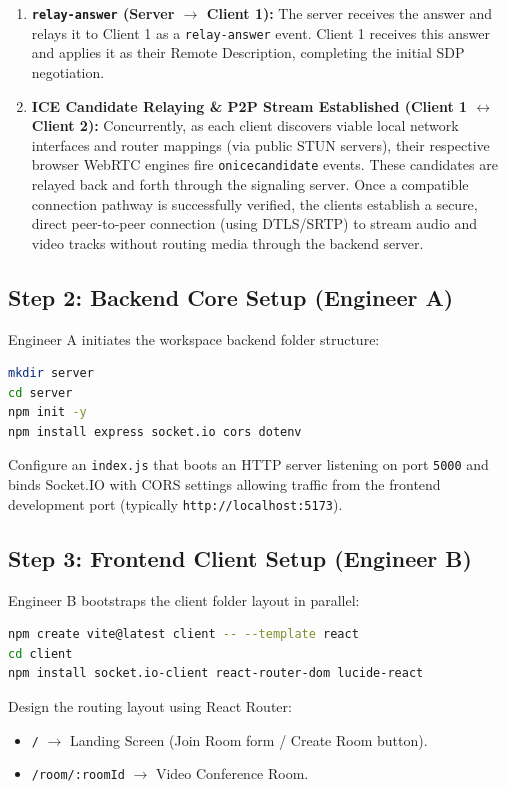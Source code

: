 \documentclass[11pt,a4paper]{article}
\begin{document}
\begin{enumerate}
    \item \textbf{\texttt{relay-answer} (Server $\rightarrow$ Client 1):} 
    The server receives the answer and relays it to Client 1 as a \texttt{relay-answer} event. Client 1 receives this answer and applies it as their Remote Description, completing the initial SDP negotiation.
    
    \item \textbf{ICE Candidate Relaying \& P2P Stream Established (Client 1 $\leftrightarrow$ Client 2):} 
    Concurrently, as each client discovers viable local network interfaces and router mappings (via public STUN servers), their respective browser WebRTC engines fire \texttt{onicecandidate} events. These candidates are relayed back and forth through the signaling server. Once a compatible connection pathway is successfully verified, the clients establish a secure, direct peer-to-peer connection (using DTLS/SRTP) to stream audio and video tracks without routing media through the backend server.
\end{enumerate}

\subsection{Step 2: Backend Core Setup (Engineer A)}
Engineer A initiates the workspace backend folder structure:
\begin{lstlisting}[language=bash]
mkdir server
cd server
npm init -y
npm install express socket.io cors dotenv
\end{lstlisting}
Configure an \texttt{index.js} that boots an HTTP server listening on port \texttt{5000} and binds Socket.IO with CORS settings allowing traffic from the frontend development port (typically \texttt{http://localhost:5173}).

\subsection{Step 3: Frontend Client Setup (Engineer B)}
Engineer B bootstraps the client folder layout in parallel:
\begin{lstlisting}[language=bash]
npm create vite@latest client -- --template react
cd client
npm install socket.io-client react-router-dom lucide-react
\end{lstlisting}
Design the routing layout using React Router:
\begin{itemize}
    \item \texttt{/} $\rightarrow$ Landing Screen (Join Room form / Create Room button).
    \item \texttt{/room/:roomId} $\rightarrow$ Video Conference Room.
\end{itemize}
\end{document}
